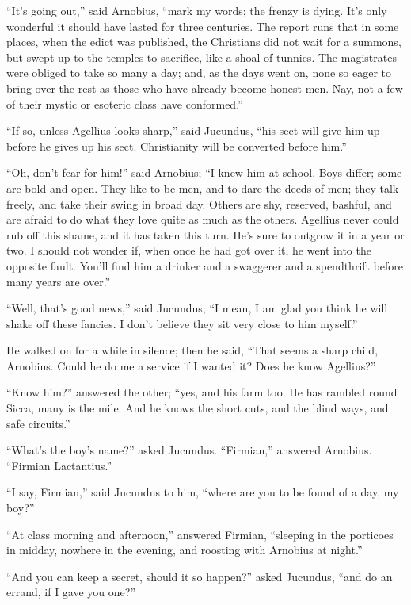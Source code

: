 ``It's going out,'' said Arnobius, ``mark my words; the
frenzy is dying. It's only wonderful it should have lasted for three
centuries. The report runs that in some places, when the edict was
published, the Christians did not wait for a summons, but swept up to
the temples to sacrifice, like a shoal of tunnies. The magistrates were obliged to take so many a day; and, as the days went
on, none so eager to bring over the rest as those who have already
become honest men. Nay, not a few of their mystic or esoteric class
have conformed.''

``If so, unless Agellius looks sharp,'' said Jucundus,
``his sect will give him up before he gives up his sect.
Christianity will be converted before him.''

``Oh, don't fear for him!'' said Arnobius; ``I knew him
at school. Boys differ; some are bold and open. They like to be men,
and to dare the deeds of men; they talk freely, and take their swing
in broad day. Others are shy, reserved, bashful, and are afraid to do
what they love quite as much as the others. Agellius never could rub
off this shame, and it has taken this turn. He's sure to outgrow it in
a year or two. I should not wonder if, when once he had got over it,
he went into the opposite fault. You'll find him a drinker and a
swaggerer and a spendthrift before many years are over.''

``Well, that's good news,'' said Jucundus; ``I mean, I
am glad you think he will shake off these fancies. I don't believe
they sit very close to him myself.''

He walked on for a while in silence; then he said, ``That seems
a sharp child, Arnobius. Could he do me a service if I wanted it? Does
he know Agellius?''

``Know him?'' answered the other; ``yes, and his farm
too. He has rambled round Sicca, many is the mile. And he knows the
short cuts, and the blind ways, and safe circuits.''

``What's the boy's name?'' asked Jucundus. ``Firmian,''
answered Arnobius. ``Firmian Lactantius.''

``I say, Firmian,'' said Jucundus to him, ``where are
you to be found of a day, my boy?''

``At class morning and afternoon,'' answered Firmian,
``sleeping in the porticoes in midday, nowhere in the evening, and
roosting with Arnobius at night.''

``And you can keep a secret, should it so happen?'' asked
Jucundus, ``and do an errand, if I gave you one?''

